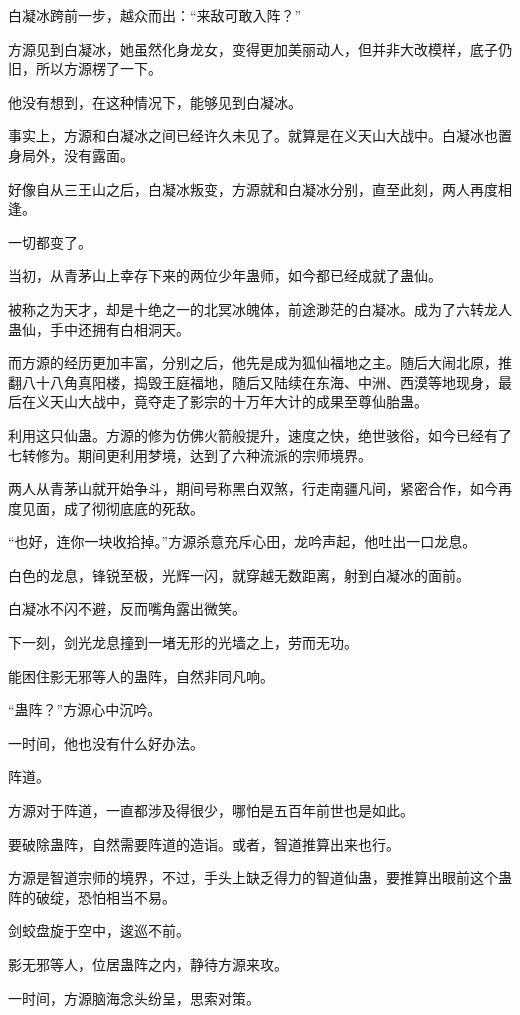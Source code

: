 \begin{this_body}
白凝冰跨前一步，越众而出：“来敌可敢入阵？”

方源见到白凝冰，她虽然化身龙女，变得更加美丽动人，但并非大改模样，底子仍旧，所以方源楞了一下。

他没有想到，在这种情况下，能够见到白凝冰。

事实上，方源和白凝冰之间已经许久未见了。就算是在义天山大战中。白凝冰也置身局外，没有露面。

好像自从三王山之后，白凝冰叛变，方源就和白凝冰分别，直至此刻，两人再度相逢。

一切都变了。

当初，从青茅山上幸存下来的两位少年蛊师，如今都已经成就了蛊仙。

被称之为天才，却是十绝之一的北冥冰魄体，前途渺茫的白凝冰。成为了六转龙人蛊仙，手中还拥有白相洞天。

而方源的经历更加丰富，分别之后，他先是成为狐仙福地之主。随后大闹北原，推翻八十八角真阳楼，捣毁王庭福地，随后又陆续在东海、中洲、西漠等地现身，最后在义天山大战中，竟夺走了影宗的十万年大计的成果至尊仙胎蛊。

利用这只仙蛊。方源的修为仿佛火箭般提升，速度之快，绝世骇俗，如今已经有了七转修为。期间更利用梦境，达到了六种流派的宗师境界。

两人从青茅山就开始争斗，期间号称黑白双煞，行走南疆凡间，紧密合作，如今再度见面，成了彻彻底底的死敌。

“也好，连你一块收拾掉。”方源杀意充斥心田，龙吟声起，他吐出一口龙息。

白色的龙息，锋锐至极，光辉一闪，就穿越无数距离，射到白凝冰的面前。

白凝冰不闪不避，反而嘴角露出微笑。

下一刻，剑光龙息撞到一堵无形的光墙之上，劳而无功。

能困住影无邪等人的蛊阵，自然非同凡响。

“蛊阵？”方源心中沉吟。

一时间，他也没有什么好办法。

阵道。

方源对于阵道，一直都涉及得很少，哪怕是五百年前世也是如此。

要破除蛊阵，自然需要阵道的造诣。或者，智道推算出来也行。

方源是智道宗师的境界，不过，手头上缺乏得力的智道仙蛊，要推算出眼前这个蛊阵的破绽，恐怕相当不易。

剑蛟盘旋于空中，逡巡不前。

影无邪等人，位居蛊阵之内，静待方源来攻。

一时间，方源脑海念头纷呈，思索对策。


\end{this_body}
